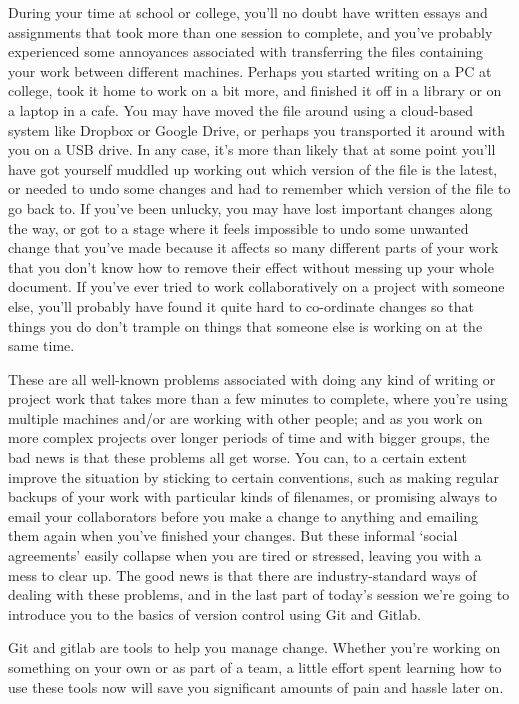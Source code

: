 During your time at school or college, you'll no doubt have written essays and assignments that took more than one session to complete, and you've probably experienced some annoyances associated with transferring the files containing your work between different machines. Perhaps you started writing on a PC at college, took it home to work on a bit more, and finished it off in a library or on a laptop in a cafe. You may have moved the file around using a cloud-based system like Dropbox or Google Drive, or perhaps you transported it around with you on a USB drive. In any case, it's more than likely that at some point you'll have got yourself muddled up working out which version of the file is the latest, or needed to undo some changes and had to remember which version of the file to go back to. If you've been unlucky, you may have lost important changes along the way, or got to a stage where it feels impossible to undo some unwanted change that you've made because it affects so many different parts of your work that you don't know how to remove their effect without messing up your whole document. If you've ever tried to work collaboratively on a project with someone else, you'll probably have found it quite hard to co-ordinate changes so that things you do don't trample on things that someone else is working on at the same time. 

These are all well-known problems associated with doing any kind of writing or project work that takes more than a few minutes to complete, where you're using multiple machines and/or are working with other people; and as you work on more complex projects over longer periods of time and with bigger groups, the bad news is that these problems all get worse. You can, to a certain extent improve the situation by sticking to certain conventions, such as making regular backups of your work with particular kinds of filenames, or promising always to email your collaborators before you make a change to anything and emailing them again when you've finished your changes. But these informal `social agreements' easily collapse when you are tired or stressed, leaving you with a mess to clear up. The good news is that there are industry-standard ways of dealing with these problems, and in the last part of today's session we're going to introduce you to the basics of version control using Git and Gitlab. 

Git and gitlab are tools to help you manage change. Whether you're working on something on your own or as part of a team, a little effort spent learning how to use these tools now will save you significant amounts of pain and hassle later on. 

